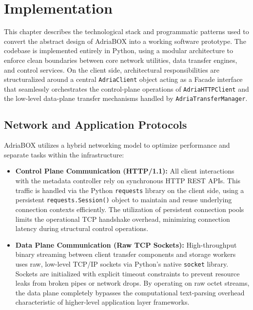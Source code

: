 \section{Implementation}
\label{sec:implementation}

This chapter describes the technological stack and programmatic patterns used to convert the abstract design of AdriaBOX into a working software prototype. The codebase is implemented entirely in Python, using a modular architecture to enforce clean boundaries between core network utilities, data transfer engines, and control services. On the client side, architectural responsibilities are structuralized around a central \texttt{AdriaClient} object acting as a Facade interface that seamlessly orchestrates the control-plane operations of \texttt{AdriaHTTPClient} and the low-level data-plane transfer mechanisms handled by \texttt{AdriaTransferManager}.

\subsection{Network and Application Protocols}
AdriaBOX utilizes a hybrid networking model to optimize performance and separate tasks within the infrastructure:
\begin{itemize}
    \item \textbf{Control Plane Communication (HTTP/1.1):} All client interactions with the metadata controller rely on synchronous HTTP REST APIs. This traffic is handled via the Python \texttt{requests} library on the client side, using a persistent \texttt{requests.Session()} object to maintain and reuse underlying connection contexts efficiently. The utilization of persistent connection pools limits the operational TCP handshake overhead, minimizing connection latency during structural control operations.
    \item \textbf{Data Plane Communication (Raw TCP Sockets):} High-throughput binary streaming between client transfer components and storage workers uses raw, low-level TCP/IP sockets via Python's native \texttt{socket} library. Sockets are initialized with explicit timeout constraints to prevent resource leaks from broken pipes or network drops. By operating on raw octet streams, the data plane completely bypasses the computational text-parsing overhead characteristic of higher-level application layer frameworks.
\end{itemize}


